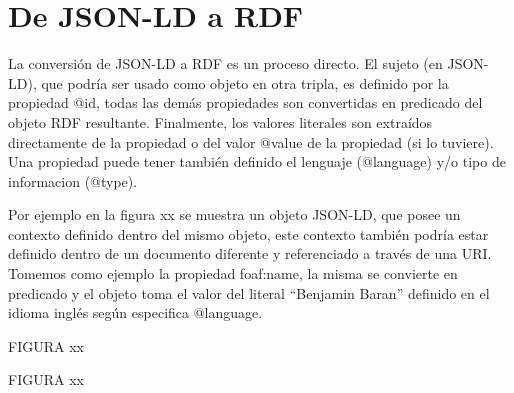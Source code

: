 \section{De JSON-LD a RDF}

La conversión de JSON-LD a RDF es un proceso directo. El sujeto (en JSON-LD), que podría ser usado como objeto en otra tripla, es definido por la propiedad @id, todas las demás propiedades son convertidas en predicado del objeto RDF resultante. Finalmente, los valores literales son extraídos directamente de la propiedad o del valor @value de la propiedad (si lo tuviere). Una propiedad puede tener también definido el lenguaje (@language) y/o tipo de informacion (@type).

Por ejemplo en la figura xx se muestra un objeto JSON-LD, que posee un contexto definido dentro del mismo objeto, este contexto también podría estar definido dentro de un documento diferente y referenciado a través de una URI. Tomemos como ejemplo la propiedad foaf:name, la misma se convierte en predicado y el objeto toma el valor del literal “Benjamin Baran” definido en el idioma inglés según especifica @language.


FIGURA xx

FIGURA xx

